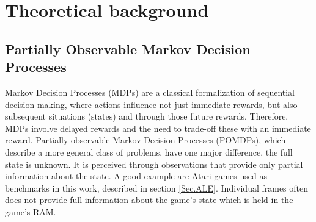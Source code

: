 \section{Theoretical background} \label{Sec.TheoreticalBackground}

\subsection{Partially Observable Markov Decision Processes} \label{Sec.POMDP}

Markov Decision Processes (MDPs) are a classical formalization of sequential decision making, where actions influence not just immediate rewards, but also subsequent situations (states) and through those future rewards. Therefore, MDPs involve delayed rewards and the need to trade-off these with an immediate reward.
Partially observable Markov Decision Processes (POMDPs), which describe a more general class of problems, have one major difference, the full state is unknown. It is perceived through observations that provide only partial information about the state. A good example are Atari games used as benchmarks in this work, described in section \ref{Sec.ALE}. Individual frames often does not provide full information about the game's state which is held in the game's RAM.

